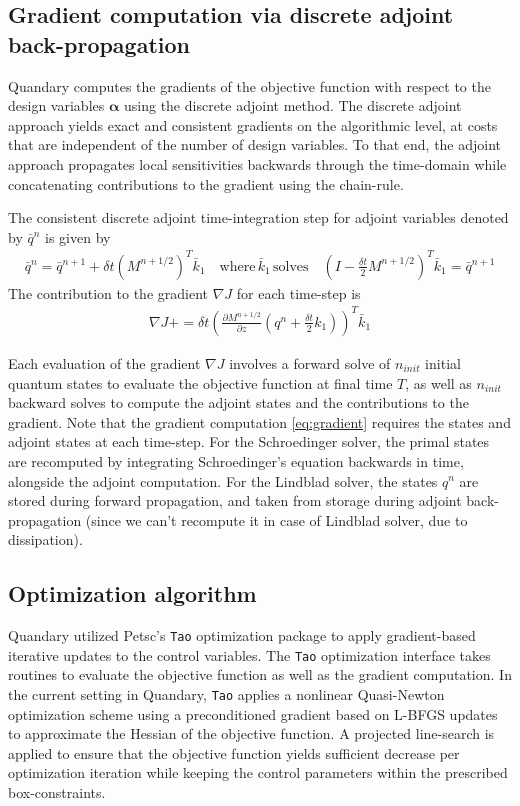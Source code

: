\documentclass[11pt]{article}
\begin{document}
  
  \subsection{Gradient computation via discrete adjoint back-propagation}
   Quandary computes the gradients of the objective function with respect to the design variables $\boldsymbol{\alpha}$ using the discrete adjoint method. The discrete adjoint approach yields exact and consistent gradients on the algorithmic level, at costs that are independent of the number of design variables.    
   To that end, the adjoint approach propagates local sensitivities backwards through the time-domain while concatenating contributions to the gradient using the chain-rule.

  The consistent discrete adjoint time-integration step for
    adjoint variables denoted by $\bar q^{n}$ is given by
   \begin{align}
      \bar q^{n} = \bar q^{n+1} + \delta t \left(M^{n+1/2}\right)^T \bar k_1
      \quad \text{where} \, \bar k_1 \, \text{solves} \quad \left(
      I-\frac{\delta t}{2} M^{n+1/2}\right)^T  \bar k_1 = \bar q^{n+1} 
    \end{align}
  The contribution to the gradient $\nabla J$ for each time-step is
    \begin{align}\label{eq:gradient}
      \nabla J += \delta t \left( \frac{\partial M^{n+1/2}}{\partial z}
      \left(q^n + \frac{\delta t}{2} k_1\right) \right)^T\bar k_1
    \end{align}
  
    Each evaluation of the gradient $\nabla J$ involves a forward solve of $n_{init}$ initial quantum states to evaluate the objective function at final time $T$, as well as $n_{init}$ backward solves to compute the adjoint states and the contributions to the gradient. Note that the gradient computation \eqref{eq:gradient} requires the states and adjoint states at each time-step. For the Schroedinger solver, the primal states are recomputed by integrating Schroedinger's equation backwards in time, alongside the adjoint computation. For the Lindblad solver, the states $q^n$ are stored during forward propagation, and taken from storage during adjoint back-propagation (since we can't recompute it in case of Lindblad solver, due to dissipation). 


  \subsection{Optimization algorithm}
    Quandary utilized Petsc's \texttt{Tao} optimization package to apply gradient-based iterative updates to the control variables. The \texttt{Tao} optimization interface takes routines to evaluate the objective function as well as the gradient computation. In the current setting in Quandary, \texttt{Tao} applies a nonlinear Quasi-Newton optimization scheme using a preconditioned gradient based on L-BFGS updates to approximate the Hessian of the objective function. A projected line-search is applied to ensure that the objective function yields sufficient decrease per optimization iteration while keeping the control parameters within the prescribed box-constraints. 
\end{document}
